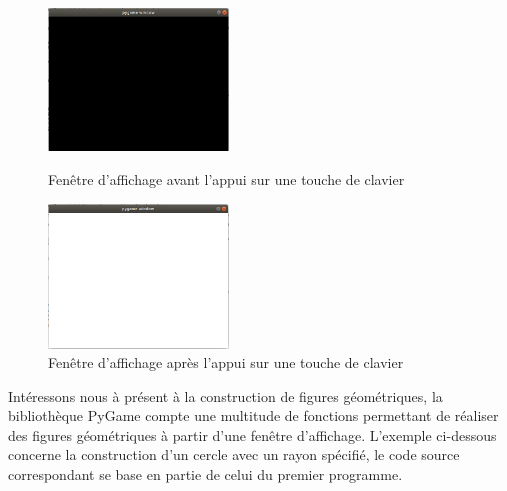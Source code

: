 \documentclass[a4paper]{article}
\begin{document}
\begin{figure}[h!]
   \begin{minipage}[b]{0.40\linewidth}
      \centering \includegraphics[width=4.8cm,scale=1.8]{f1.png}
      \caption{Fenêtre d'affichage avant l'appui sur une touche de clavier}
   \end{minipage}\hfill
   \begin{minipage}[b]{0.40\linewidth}   
      \centering \includegraphics[width=4.8cm,scale=1.8]{f2.png}
      \caption{Fenêtre d'affichage après l'appui sur une touche de clavier}
   \end{minipage}

   \end{figure}


Intéressons nous à présent à la construction de figures géométriques, la bibliothèque PyGame compte une multitude de fonctions
permettant de réaliser des figures géométriques à partir d'une fenêtre d'affichage. 
L'exemple ci-dessous concerne la construction d'un cercle avec un rayon spécifié, le code source correspondant se base en partie de celui du premier programme.
\end{document}
